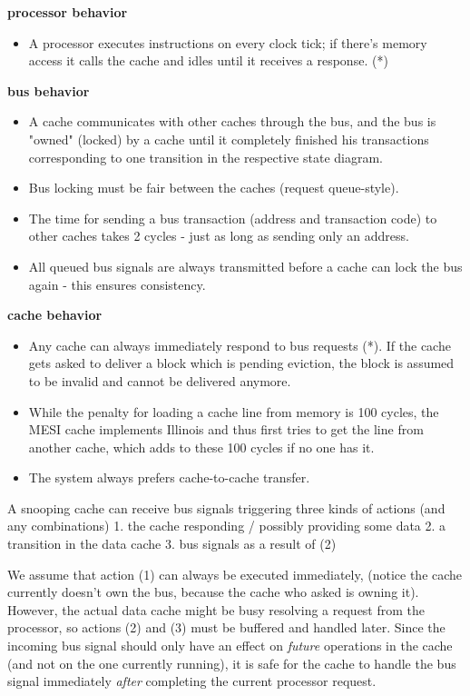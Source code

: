 \documentclass{article}
\begin{document}
\begin{multicols}{2}

\textbf{processor behavior}

\begin{itemize}
    \item A processor executes instructions on every clock tick; if there's memory access it calls the cache and idles until it receives a response. (*)
\end{itemize}

\textbf{bus behavior}

\begin{itemize}
    \item A cache communicates with other caches through the bus, and the bus is "owned" (locked) by a cache until it completely finished his transactions corresponding to one transition in the respective state diagram.
    \item Bus locking must be fair between the caches (request queue-style).
    \item The time for sending a bus transaction (address and transaction code) to other caches takes 2 cycles - just as long as sending only an address.
    \item All queued bus signals are always transmitted before a cache can lock the bus again - this ensures consistency.
\end{itemize}

\textbf{cache behavior}

\begin{itemize}
    \item Any cache can always immediately respond to bus requests (*). If the cache gets asked to deliver a block which is pending eviction, the block is assumed to be invalid and cannot be delivered anymore.
    \item While the penalty for loading a cache line from memory is 100 cycles, the MESI cache implements Illinois and thus first tries to get the line from another cache, which adds to these 100 cycles if no one has it.
    \item The system always prefers cache-to-cache transfer.
\end{itemize}

A snooping cache can receive bus signals triggering three kinds of actions (and any combinations)
    1. the cache responding / possibly providing some data
    2. a transition in the data cache
    3. bus signals as a result of (2)

We assume that action (1) can always be executed immediately, (notice the cache currently doesn't own the bus, because the cache who asked is owning it). However, the actual data cache might be busy resolving a request from the processor, so actions (2) and (3) must be buffered and handled later. Since the incoming bus signal should only have an effect on \textit{future} operations in the cache (and not on the one currently running), it is safe for the cache to handle the bus signal immediately \textit{after} completing the current processor request.


\end{multicols}
\end{document}
